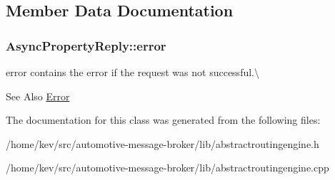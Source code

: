 \subsection{Member Data Documentation}
\hypertarget{classAsyncPropertyReply_a8c5cb98a6e2a72d6d94b43449a5e842d}{
\subsubsection[{error}]{ Async\-Property\-Reply\-::error}}\label{classAsyncPropertyReply_a8c5cb98a6e2a72d6d94b43449a5e842d}


error contains the error if the request was not successful.\textbackslash{} 

\begin{DoxySeeAlso}{See Also}
\hyperlink{classAsyncPropertyReply_ad91affaa25fcc3b73947a6cf4591e5d1}{Error} 
\end{DoxySeeAlso}


The documentation for this class was generated from the following files\-:\begin{DoxyCompactItemize}
\item 
/home/kev/src/automotive-\/message-\/broker/lib/abstractroutingengine.\-h\item 
/home/kev/src/automotive-\/message-\/broker/lib/abstractroutingengine.\-cpp\end{DoxyCompactItemize}
